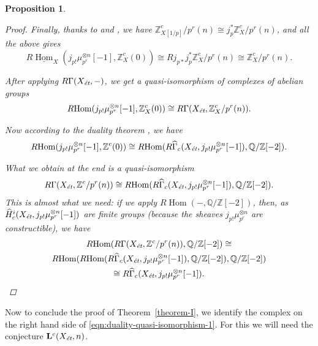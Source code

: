 \documentclass{article}
\DeclareMathOperator{\Hom}{Hom}
\newcommand{\QQ}{\mathbb{Q}}
\newcommand{\ZZ}{\mathbb{Z}}
\newcommand{\et}{\text{\it ét}}
\newcommand{\iHom}{\underline{\Hom}}
\newcommand{\RHom}{R\!\Hom}
\newtheorem{proposition}[theorem]{Proposition}
\theoremstyle{definition}
\numberwithin{equation}{section}
\begin{document}
\begin{proposition}
\begin{proof}
    Finally, thanks to \cite[Theorem 7.2 (a)]{Geisser-2010} and
    \cite[Proposition 2.3]{Geisser-2010}, we have
    $\ZZ^c_{X [1/p]}/p^r (n) \cong j_p^*\ZZ^c_X/p^r (n)$, and all the above
    gives
    \begin{equation}
      R\iHom_X (j_{p!} \mu_{p^r}^{\otimes n} [-1], \ZZ^c_X (0)) \cong
      R j_{p*} j_p^* \ZZ^c_X/p^r (n) \cong \ZZ^c_X/p^r (n).
    \end{equation}

    After applying $R\Gamma (X_\et, -)$, we get a quasi-isomorphism of
    complexes of abelian groups
    \begin{equation}
      \RHom (j_{p!} \mu_{p^r}^{\otimes n} [-1], \ZZ^c_X (0)) \cong
      R\Gamma (X_\et, \ZZ^c_X/p^r (n)).
    \end{equation}

    Now according to the duality theorem \cite[Theorem 7.8]{Geisser-2010},
    we have
    \begin{equation}
      \RHom (j_{p !} \mu_{p^r}^{\otimes n} [-1], \ZZ^c (0)) \cong
      \RHom (R\widehat{\Gamma}_c (X_\et, j_{p !} \mu_{p^r}^{\otimes n} [-1]), \QQ/\ZZ [-2]).
    \end{equation}

    What we obtain at the end is a quasi-isomorphism
    \[ R\Gamma (X_\et, \ZZ^c/p^r (n)) \cong
    \RHom (R\widehat{\Gamma}_c (X_\et, j_{p !} \mu_{p^r}^{\otimes n} [-1]), \QQ/\ZZ [-2]). \]
    This is almost what we need: if we apply $\RHom (-,\QQ/\ZZ [-2])$, then, as
    $\widehat{H}^i_c (X_\et, j_{p!} \mu_{p^r}^{\otimes n} [-1])$ are
    finite groups (because the sheaves $j_{p!} \mu_{p^r}^{\otimes n}$ are
    constructible), we have
    \begin{multline*}
      \RHom (R\Gamma (X_\et, \ZZ^c/p^r (n)), \QQ/\ZZ[-2]) \cong\\
      \RHom (\RHom (R\widehat{\Gamma}_c (X_\et, j_{p !} \mu_{p^r}^{\otimes n} [-1]), \QQ/\ZZ[-2]), \QQ/\ZZ[-2]) \\
      \cong R\widehat{\Gamma}_c (X_\et, j_{p !} \mu_{p^r}^{\otimes n} [-1]). \qedhere
    \end{multline*}
  \end{proof}
\end{proposition}

Now to conclude the proof of Theorem~\ref{theorem-I}, we identify the complex
on the right hand side of \eqref{eqn:duality-quasi-isomorphism-1}. For this we
will need the conjecture $\mathbf{L}^c (X_\et, n)$.
\end{document}
